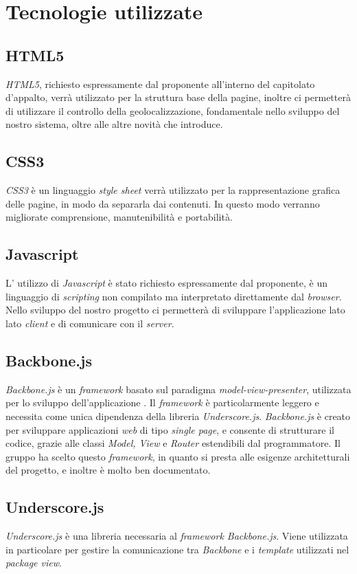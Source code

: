 \appendix
\section{Tecnologie utilizzate}
\subsection{HTML5}
\textit{HTML5}, richiesto espressamente dal proponente all'interno del capitolato d'appalto, verrà utilizzato per la struttura base della pagine, inoltre ci permetterà di utilizzare il controllo della geolocalizzazione, fondamentale nello sviluppo del nostro sistema, oltre alle altre novità che introduce.
\subsection{CSS3}
\textit{CSS3} è un linguaggio \textit{style sheet} verrà utilizzato per la rappresentazione grafica delle pagine, in modo da separarla dai contenuti. In questo modo verranno migliorate comprensione, manutenibilità e portabilità.
\subsection{Javascript}
L' utilizzo di \textit{Javascript} è stato richiesto espressamente dal proponente, è un linguaggio di \textit{scripting} non compilato ma interpretato direttamente dal \textit{browser}. Nello sviluppo del nostro progetto ci permetterà di sviluppare l'applicazione lato lato \textit{client} e di comunicare con il \textit{server}.
\subsection{Backbone.js}
\textit{Backbone.js} è un \textit{framework} basato sul paradigma \textit{model-view-presenter}, utilizzata per lo sviluppo dell'applicazione \progetto{}.
Il \textit{framework} è particolarmente leggero e necessita come unica dipendenza della libreria \textit{Underscore.js}.
\textit{Backbone.js} è creato per sviluppare applicazioni \textit{web} di tipo \textit{single page}, e consente di strutturare il codice, grazie alle classi \textit{Model, View} e \textit{Router} estendibili dal programmatore.
Il gruppo \gruppo{} ha scelto questo \textit{framework}, in quanto si presta alle esigenze architetturali del progetto, e inoltre è molto ben documentato.
\subsection{Underscore.js}
\textit{Underscore.js} è una libreria necessaria al \textit{framework Backbone.js}. Viene utilizzata in particolare per gestire la comunicazione tra \textit{Backbone} e i \textit{template} utilizzati nel \textit{package view}.
